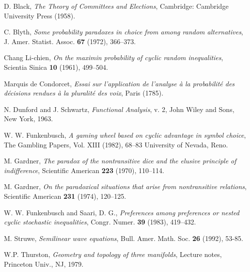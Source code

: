 \documentclass{article}
\begin{document}
\begin{thebibliography}{99}
 D. Black, \emph{The Theory of Committees and Elections},
Cambridge: Cambridge University Press (1958).

 C. Blyth, \emph{Some probability paradoxes in choice from
among random alternatives}, J. Amer. Statist. Assoc. \textbf{67} (1972),
366--373.

 Chang Li-chien, \emph{On the maximin probability of cyclic
random inequalities}, Scientia Sinica \textbf{10} (1961), 499--504.

 Marquis de Condorcet, \emph{Essai sur l'application de
l'analyse \`{a} la probabilit\'{e} des d\'{e}cisions rendues \`{a} la
pluralit\'{e} des voix}, Paris (1785).

 N. Dunford and J. Schwartz, \emph{Functional Analysis}, v.
2, John Wiley and Sons, New York, 1963.

 W. W. Funkenbusch, \emph{A gaming wheel based on
cyclic advantage in symbol choice}, The Gambling Papers, Vol. XIII (1982),
68--83 University of Nevada, Reno.

 M. Gardner, \emph{The paradox of the nontransitive dice
and the elusive principle of indifference}, Scientific American \textbf{223}
(1970), 110--114.

 M. Gardner, \emph{On the paradoxical situations that
arise from nontransitive relations}, Scientific American \textbf{231}
(1974), 120--125.

 W. W. Funkenbusch and Saari, D. G., \emph{Preferences
among preferences or nested cyclic stochastic inequalities}, Congr. Numer. 
\textbf{39} (1983), 419--432.

 M. Struwe, \emph{Semilinear wave equations}, Bull. Amer.
Math. Soc. \textbf{26} (1992), 53-85.

 W.P. Thurston, \emph{Geometry and topology of three
manifolds}, Lecture notes, Princeton Univ., NJ, 1979.
\end{thebibliography}
\end{document}
